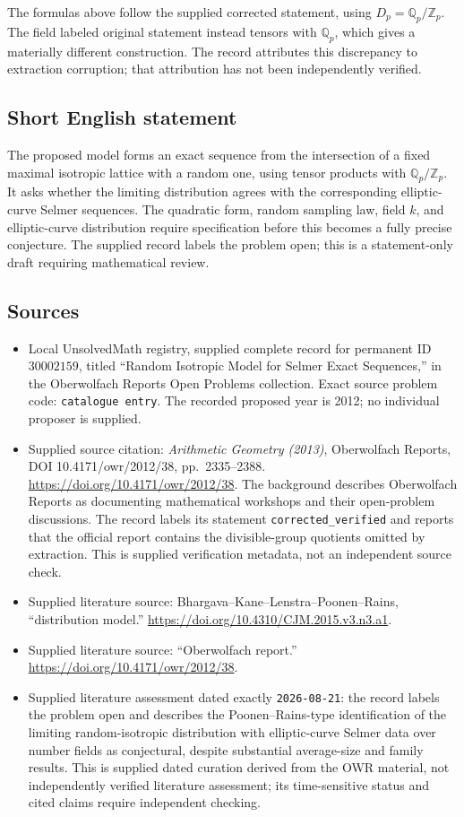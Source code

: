 \documentclass[11pt]{article}
\begin{document}
The formulas above follow the supplied corrected statement, using \(D_p=\mathbb Q_p/\mathbb Z_p\). The field labeled original statement instead tensors with \(\mathbb Q_p\), which gives a materially different construction. The record attributes this discrepancy to extraction corruption; that attribution has not been independently verified.
\subsection{Short English statement}
The proposed model forms an exact sequence from the intersection of a fixed maximal isotropic lattice with a random one, using tensor products with \(\mathbb Q_p/\mathbb Z_p\). It asks whether the limiting distribution agrees with the corresponding elliptic-curve Selmer sequences. The quadratic form, random sampling law, field \(k\), and elliptic-curve distribution require specification before this becomes a fully precise conjecture. The supplied record labels the problem open; this is a statement-only draft requiring mathematical review.
\subsection{Sources}
\begin{itemize}
\item Local UnsolvedMath registry, supplied complete record for permanent ID \(30002159\), titled ``Random Isotropic Model for Selmer Exact Sequences,'' in the Oberwolfach Reports Open Problems collection. Exact source problem code: \texttt{catalogue entry}. The recorded proposed year is 2012; no individual proposer is supplied.
\item Supplied source citation: \emph{Arithmetic Geometry (2013)}, Oberwolfach Reports, DOI 10.4171/owr/2012/38, pp.\ 2335--2388. \url{https://doi.org/10.4171/owr/2012/38}. The background describes Oberwolfach Reports as documenting mathematical workshops and their open-problem discussions. The record labels its statement \texttt{corrected\_verified} and reports that the official report contains the divisible-group quotients omitted by extraction. This is supplied verification metadata, not an independent source check.
\item Supplied literature source: Bhargava--Kane--Lenstra--Poonen--Rains, ``distribution model.'' \url{https://doi.org/10.4310/CJM.2015.v3.n3.a1}.
\item Supplied literature source: ``Oberwolfach report.'' \url{https://doi.org/10.4171/owr/2012/38}.
\item Supplied literature assessment dated exactly \texttt{2026-08-21}: the record labels the problem open and describes the Poonen--Rains-type identification of the limiting random-isotropic distribution with elliptic-curve Selmer data over number fields as conjectural, despite substantial average-size and family results. This is supplied dated curation derived from the OWR material, not independently verified literature assessment; its time-sensitive status and cited claims require independent checking.
\end{itemize}
\end{document}
